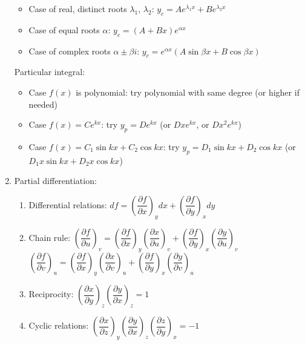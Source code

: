 \documentclass[fleqn]{article}
\begin{document}
\begin{enumerate}
        \begin{itemize}[label={--}, noitemsep, topsep=0pt]
            \item Case of real, distinct roots $\lambda_1$, $\lambda_2$: $y_c=Ae^{\lambda_1x}+Be^{\lambda_2x}$
            \item Case of equal roots $\alpha$: $y_c=(A+Bx)e^{\alpha x}$
            \item Case of complex roots $\alpha\pm\beta i$: $y_c=e^{\alpha x}(A\sin\beta x+B\cos\beta x)$
        \end{itemize}
        Particular integral: 
        \begin{itemize}[label={--}, noitemsep, topsep=0pt]
            \item Case $f(x)$ is polynomial: try polynomial with same degree (or higher if needed)
            \item Case $f(x)=Ce^{kx}$: try $y_p=De^{kx}$ (or $Dxe^{kx}$, or $Dx^2e^{kx}$)
            \item Case $f(x)=C_1\sin{kx}+C_2\cos{kx}$: try $y_p=D_1\sin{kx}+D_2\cos{kx}$ (or $D_1x\sin{kx}+D_2x\cos{kx}$)
        \end{itemize}
    \item Partial differentiation:
        \begin{enumerate}[1)]
            \item Differential relations:\smallbreak
                $df=\left(\dfrac{\partial f}{\partial x}\right)_ydx+\left(\dfrac{\partial f}{\partial y}\right)_xdy$
            \item Chain rule:\smallbreak
                $\left(\dfrac{\partial f}{\partial u}\right)_v=\left(\dfrac{\partial f}{\partial x}\right)_y\left(\dfrac{\partial x}{\partial u}\right)_v+\left(\dfrac{\partial f}{\partial y}\right)_x\left(\dfrac{\partial y}{\partial u}\right)_v$\\
                $\left(\dfrac{\partial f}{\partial v}\right)_u=\left(\dfrac{\partial f}{\partial x}\right)_y\left(\dfrac{\partial x}{\partial v}\right)_u+\left(\dfrac{\partial f}{\partial y}\right)_x\left(\dfrac{\partial y}{\partial v}\right)_u$
            \item Reciprocity:\smallbreak
                $\left(\dfrac{\partial x}{\partial y}\right)_z\left(\dfrac{\partial y}{\partial x}\right)_z=1$
            \item Cyclic relations:\smallbreak
                $\left(\dfrac{\partial x}{\partial z}\right)_y\left(\dfrac{\partial y}{\partial x}\right)_z\left(\dfrac{\partial z}{\partial y}\right)_x=-1$

\end{enumerate}
\end{enumerate}
\end{document}
